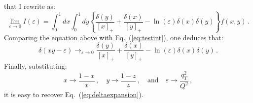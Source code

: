 \documentclass[10pt,a4paper]{article}
\begin{document}
that I rewrite as:
\begin{equation}
\lim_{\varepsilon\rightarrow 0}I(\varepsilon) =\int_0^1dx \int_0^1dy\left\{\frac{\delta(y)}{[x]_+}+\frac{\delta(x)}{[y]_+}-\ln\left(\varepsilon\right)\delta(x)\delta(y)\right\}f(x,y)\,.
\end{equation}
Comparing the equation above with Eq.~(\ref{eq:testint}), one deduces that:
\begin{equation}
\delta(xy-\varepsilon)\mathop{\longrightarrow}_{\varepsilon\rightarrow 0}
\frac{\delta(y)}{[x]_+}+\frac{\delta(x)}{[y]_+}-\ln\left(\varepsilon\right)\delta(x)\delta(y)\,.
\end{equation}
Finally, substituting:
\begin{equation}
x\rightarrow \frac{1-x}{x}\,,\quad y\rightarrow \frac{1-z}{z}\,,\quad\mbox{and}\quad\varepsilon\rightarrow\frac{q_T^2}{Q^2}\,,
\end{equation}
it is easy to recover Eq.~(\ref{eq:deltaexpansion}).


\newpage
\end{document}
